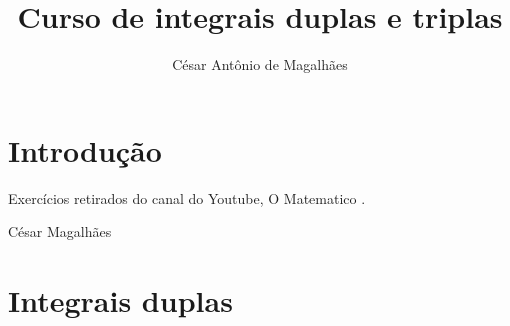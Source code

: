 \documentclass[
12pt,				%
openright,			%
twoside,			%
a4paper,			%
english,			%
french,				%
spanish,			%
brazil,				%
]{abntex2}
\title{Curso de integrais duplas e triplas}
\author{César Antônio de Magalhães}
\begin{document}

\frenchspacing 


\imprimircapa

\imprimirfolhaderosto


\listoffigures*
\cleardoublepage

\listoftables*
\cleardoublepage

\tableofcontents*
\cleardoublepage


\textual

\chapter*[Introdução]{Introdução}

Exercícios retirados do canal do Youtube, O Matematico \cite{curso_integrais_duplas_triplas}.

César Magalhães


\chapter{Integrais duplas}\label{integrais_duplas}
\end{document}
